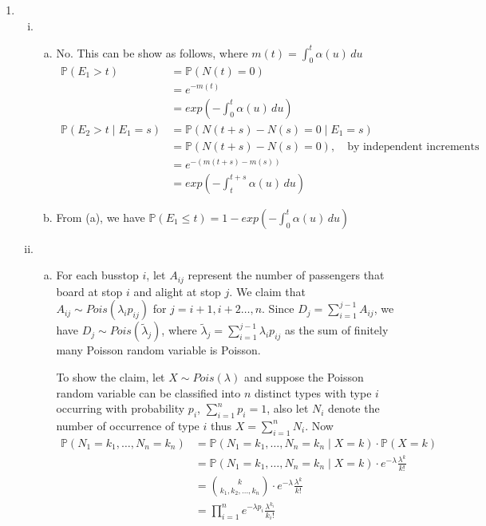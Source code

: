 \documentclass[a4paper,10pt]{article}
\theoremstyle{definition}
\begin{document}
\begin{enumerate}
\item
\begin{enumerate}[(i)]
\item
\begin{enumerate}[(a)]
\item No. This can be show as follows, where $m(t)=\int_{0}^{t}\alpha(u)\,du$
\begin{align*}
\mathbb{P}(E_1>t)&=\mathbb{P}(N(t)=0)\\
&=e^{-m(t)}\\
&=exp\left(-\int_{0}^{t}\alpha(u)\,du\right)\\
\mathbb{P}(E_2>t\mid E_1=s)&=\mathbb{P}(N(t+s)-N(s)=0\mid E_1=s)\\
&=\mathbb{P}(N(t+s)-N(s)=0),\quad \text{by independent increments}\\
&=e^{-(m(t+s)-m(s))}\\
&=exp\left(-\int_{t}^{t+s}\alpha(u)\,du\right)
\end{align*}
\item From (a), we have $\mathbb{P}(E_1\leq t)=1-exp\left(-\int_{0}^{t}\alpha(u)\,du\right)$
\end{enumerate}
\item
\begin{enumerate}[(a)]
\item For each busstop $i$, let $A_{ij}$ represent the number of passengers that board at stop $i$ and alight at stop $j$. We claim that $A_{ij}\sim Pois(\lambda_ip_{ij})$ for $j=i+1,i+2\ldots,n$. Since $D_j=\sum_{i=1}^{j-1}A_{ij}$, we have $D_j\sim Pois(\tilde{\lambda}_j)$, where $\tilde{\lambda}_j=\sum_{i=1}^{j-1}\lambda_ip_{ij}$ as the sum of finitely many Poisson random variable is Poisson. 

To show the claim, let $X\sim Pois(\lambda)$ and suppose the Poisson random variable can be classified into $n$ distinct types with type $i$ occurring with probability $p_i$, $\sum_{i=1}^np_i=1$, also let $N_i$ denote the number of occurrence of type $i$ thus $X=\sum_{i=1}^{n}N_i$. Now
\begin{align*}
\mathbb{P}(N_1=k_1, \ldots, N_n=k_n)&=\mathbb{P}(N_1=k_1, \ldots, N_n=k_n\mid X=k)\cdot \mathbb{P}(X=k)\\
&=\mathbb{P}(N_1=k_1, \ldots, N_n=k_n\mid X=k)\cdot e^{-\lambda}\frac{\lambda^k}{k!}\\
&= \binom {k} {k_1,k_2,\ldots,k_n}\cdot e^{-\lambda}\frac{\lambda^k}{k!}\\
&= \prod_{i=1}^{n} e^{-\lambda p_i}\frac{\lambda^{k_i}}{k_i!}
\end{align*}


\end{enumerate}
\end{enumerate}
\end{enumerate}
\end{document}
